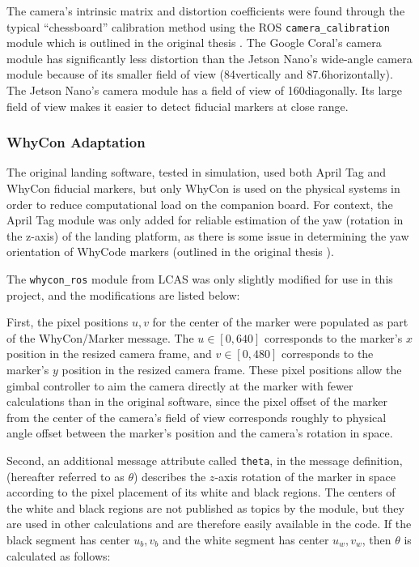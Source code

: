 The camera's intrinsic matrix and distortion coefficients were found through the typical ``chessboard'' calibration method using the ROS \texttt{camera\_calibration} module \cite{ros_camera_calibration} which is outlined in the original thesis \cite{AL_thesis}. The Google Coral's camera module has significantly less distortion than the Jetson Nano's wide-angle camera module because of its smaller field of view (84\degree vertically and 87.6\degree horizontally). The Jetson Nano's camera module has a field of view of 160\degree diagonally. Its large field of view makes it easier to detect fiducial markers at close range.

\subsubsection{WhyCon Adaptation}
\label{section:whycon_adaptation}

The original landing software, tested in simulation, used both April Tag and WhyCon fiducial markers, but only WhyCon is used on the physical systems in order to reduce computational load on the companion board. For context, the April Tag module was only added for reliable estimation of the yaw (rotation in the z-axis) of the landing platform, as there is some issue in determining the yaw orientation of WhyCode markers (outlined in the original thesis \cite{AL_thesis}). 

The \texttt{whycon\_ros} module from LCAS \cite{whycon_github} was only slightly modified for use in this project, and the modifications are listed below:

First, the pixel positions $u,v$ for the center of the marker were populated as part of the WhyCon/Marker message. The $u \in [0, 640]$ corresponds to the marker's $x$ position in the resized camera frame, and $v \in [0, 480]$ corresponds to the marker's $y$ position in the resized camera frame. These pixel positions allow the gimbal controller to aim the camera directly at the marker with fewer calculations than in the original software, since the pixel offset of the marker from the center of the camera's field of view corresponds roughly to physical angle offset between the marker's position and the camera's rotation in space.

Second, an additional message attribute called \texttt{theta}, in the message definition, (hereafter referred to as $\theta$) describes the $z$-axis rotation of the marker in space according to the pixel placement of its white and black regions. The centers of the white and black regions are not published as topics by the module, but they are used in other calculations and are therefore easily available in the code. If the black segment has center $u_b,v_b$ and the white segment has center $u_w,v_w$, then $\theta$ is calculated as follows:

